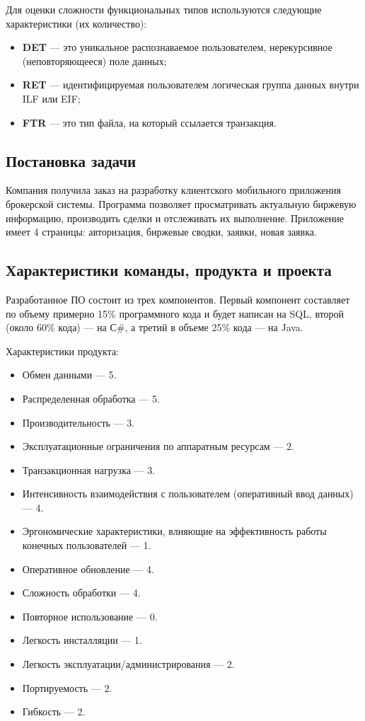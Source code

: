 \documentclass{bmstu}
\begin{document}
Для оценки сложности функциональных типов используются следующие характеристики (их количество):

\begin{itemize}
    \item \textbf{DET} --- это уникальное распознаваемое пользователем, нерекурсивное (неповторяющееся) поле данных;
    \item \textbf{RET} --- идентифицируемая пользователем логическая группа данных внутри ILF или EIF;
    \item \textbf{FTR} --- это тип файла, на который ссылается транзакция.
\end{itemize}

\subsection*{Постановка задачи}

Компания получила заказ на разработку клиентского мобильного приложения брокерской системы. Программа позволяет просматривать актуальную биржевую информацию, производить сделки и отслеживать их выполнение. Приложение имеет 4 страницы: авторизация, биржевые сводки, заявки, новая заявка.

\subsection*{Характеристики команды, продукта и
проекта}

Разработанное ПО состоит из трех компонентов. Первый компонент
составляет по объему примерно 15\% программного кода и будет написан на
SQL, второй (около 60\% кода) --- на С\#, а третий в объеме 25\% кода --- на Java.

Характеристики продукта:

\begin{itemize}
    \item Обмен данными --- 5.
    \item Распределенная обработка --- 5.
    \item Производительность --- 3.
    \item Эксплуатационные ограничения по аппаратным ресурсам --- 2.
    \item Транзакционная нагрузка --- 3.
    \item Интенсивность взаимодействия с пользователем (оперативный ввод данных) --- 4.
    \item Эргономические характеристики, влияющие на эффективность работы конечных пользователей --- 1.
    \item Оперативное обновление --- 4.
    \item Сложность обработки --- 4.
    \item Повторное использование --- 0.
    \item Легкость инсталляции --- 1.
    \item Легкость эксплуатации/администрирования --- 2.
    \item Портируемость --- 2.
    \item Гибкость --- 2.
\end{itemize}
\end{document}
